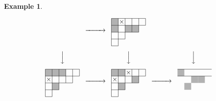 \documentclass[10pt]{amsart}
\theoremstyle{definition}
\newtheorem{exam}[theo]{Example}
\theoremstyle{remark}
\begin{document}
\begin{exam}
\begin{figure}[t]
$$\begin{CD}
{}
@>>>
\raisebox{-20pt}{
\begin{picture}(50,40)
\fboxsep=0mm
\put(0,30){\colorbox[gray]{0.7}{\makebox(10,10){}}}
\put(20,20){\colorbox[gray]{0.7}{\makebox(10,10){}}}
\put(30,20){\colorbox[gray]{0.7}{\makebox(10,10){}}}
\put(0,20){\colorbox[gray]{0.7}{\makebox(10,10){}}}
\put(0,40){\line(1,0){50}}
\put(0,30){\line(1,0){50}}
\put(0,20){\line(1,0){40}}
\put(0,10){\line(1,0){20}}
\put(0,0){\line(1,0){10}}
\put(0,0){\line(0,1){40}}
\put(10,0){\line(0,1){40}}
\put(20,10){\line(0,1){30}}
\put(30,20){\line(0,1){20}}
\put(40,20){\line(0,1){20}}
\put(50,30){\line(0,1){10}}
\put(10,30){\makebox(10,10){$\times$}}
\end{picture}
}
\\[5pt]
@VVV
@VVV
@VVV
\\[5pt]
\raisebox{-20pt}{
\begin{picture}(50,40)
\fboxsep=0mm
\put(0,30){\colorbox[gray]{0.7}{\makebox(10,10){}}}
\put(10,30){\colorbox[gray]{0.7}{\makebox(10,10){}}}
\put(20,30){\colorbox[gray]{0.7}{\makebox(10,10){}}}
\put(10,10){\colorbox[gray]{0.7}{\makebox(10,10){}}}
\put(0,40){\line(1,0){50}}
\put(0,30){\line(1,0){50}}
\put(0,20){\line(1,0){40}}
\put(0,10){\line(1,0){20}}
\put(0,0){\line(1,0){10}}
\put(0,0){\line(0,1){40}}
\put(10,0){\line(0,1){40}}
\put(20,10){\line(0,1){30}}
\put(30,20){\line(0,1){20}}
\put(40,20){\line(0,1){20}}
\put(50,30){\line(0,1){10}}
\put(0,20){\makebox(10,10){$\times$}}
\end{picture}
}
@>>>
\raisebox{-20pt}{
\begin{picture}(50,40)
\fboxsep=0mm
\put(0,30){\colorbox[gray]{0.7}{\makebox(10,10){}}}
\put(10,30){\colorbox[gray]{0.7}{\makebox(10,10){}}}
\put(30,20){\colorbox[gray]{0.7}{\makebox(10,10){}}}
\put(10,10){\colorbox[gray]{0.7}{\makebox(10,10){}}}
\put(0,40){\line(1,0){50}}
\put(0,30){\line(1,0){50}}
\put(0,20){\line(1,0){40}}
\put(0,10){\line(1,0){20}}
\put(0,0){\line(1,0){10}}
\put(0,0){\line(0,1){40}}
\put(10,0){\line(0,1){40}}
\put(20,10){\line(0,1){30}}
\put(30,20){\line(0,1){20}}
\put(40,20){\line(0,1){20}}
\put(50,30){\line(0,1){10}}
\put(0,20){\makebox(10,10){$\times$}}
\put(20,30){\makebox(10,10){$\times$}}
\end{picture}
}
@>>>
\raisebox{-20pt}{
\begin{picture}(50,40)
\fboxsep=0mm
\put(0,30){\colorbox[gray]{0.7}{\makebox(10,10){}}}
\put(20,20){\colorbox[gray]{0.7}{\makebox(10,10){}}}
\put(30,20){\colorbox[gray]{0.7}{\makebox(10,10){}}}
\put(10,10){\colorbox[gray]{0.7}{\makebox(10,10){}}}
\put(0,40){\line(1,0){50}}
\put(0,30){\line(1,0){50}}

\end{picture}}
\end{CD}$$
\end{figure}
\end{exam}
\end{document}
